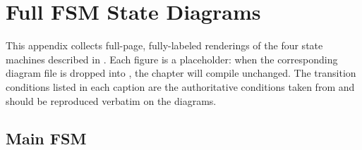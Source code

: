 
\chapter{Full FSM State Diagrams}
\label{app:fsm-diagrams}

This appendix collects full-page, fully-labeled renderings of the four
state machines described in . Each figure is a placeholder:
when the corresponding diagram file is dropped into , the
chapter will compile unchanged. The transition conditions listed in each
caption are the authoritative conditions taken from 
and should be reproduced verbatim on the diagrams.

\section{Main FSM}
\label{app:fsm-main}

